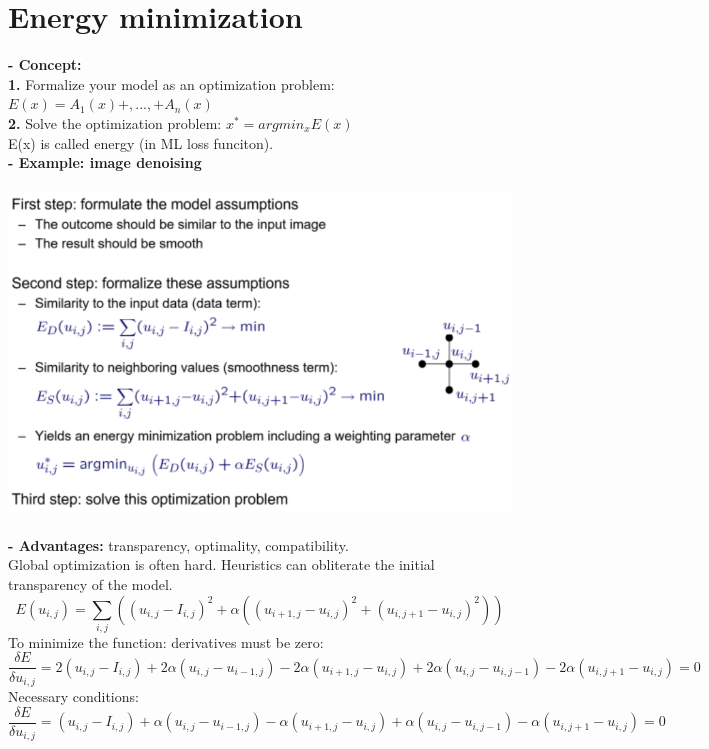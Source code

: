 \documentclass{article}
\begin{document}
\section{Energy minimization}
\textbf{- Concept: }\\
\textbf{1.} Formalize your model as an optimization problem: $E(x)=A_1(x)+,...,+A_n(x)$\\
\textbf{2.} Solve the optimization problem: $x^*=argmin_xE(x)$\\
E(x) is called energy (in ML loss funciton).\\
\textbf{- Example: image denoising} \\\\
\includegraphics[scale=0.3]{30.png}\\\\
\textbf{- Advantages: }transparency, optimality, compatibility.\\
Global optimization is often hard. Heuristics can obliterate the initial transparency of the model.\\
\begin{equation}
E(u_{i,j})=\sum_{i,j}((u_{i,j}-I_{i,j})^2+\alpha((u_{i+1,j}-u_{i,j})^2+(u_{i,j+1}-u_{i,j})^2))
\end{equation}
To minimize the function: derivatives must be zero:
\begin{equation}
\frac{\delta E}{\delta u_{i,j}}=2(u_{i,j}-I_{i,j})+2\alpha(u_{i,j}-u_{i-1,j})-2\alpha (u_{i+1,j}-u_{i,j})+2\alpha(u_{i,j}-u_{i,j-1})-2\alpha(u_{i,j+1}-u_{i,j})=0
\end{equation}
Necessary conditions:\\
\begin{equation}
\frac{\delta E}{\delta u_{i,j}}=(u_{i,j}-I_{i,j})+\alpha(u_{i,j}-u_{i-1,j})-\alpha (u_{i+1,j}-u_{i,j})+\alpha(u_{i,j}-u_{i,j-1})-\alpha(u_{i,j+1}-u_{i,j})=0
\end{equation}
\end{document}
